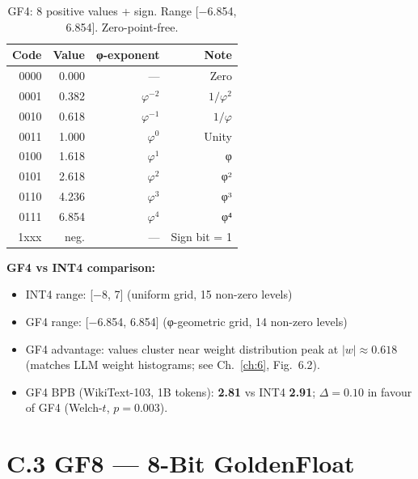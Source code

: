 \begin{table}[h]
\centering
\begin{tabular}{rrrr}
\toprule
\textbf{Code} & \textbf{Value} & \textbf{φ-exponent} & \textbf{Note} \\
\midrule
0000 & 0.000 & --- & Zero \\
0001 & 0.382 & $\varphi^{-2}$ & $1/\varphi^2$ \\
0010 & 0.618 & $\varphi^{-1}$ & $1/\varphi$ \\
0011 & 1.000 & $\varphi^0$ & Unity \\
0100 & 1.618 & $\varphi^1$ & φ \\
0101 & 2.618 & $\varphi^2$ & φ² \\
0110 & 4.236 & $\varphi^3$ & φ³ \\
0111 & 6.854 & $\varphi^4$ & φ⁴ \\
1xxx & neg.  & --- & Sign bit = 1 \\
\bottomrule
\end{tabular}
\caption{GF4: 8 positive values + sign.  Range [$-$6.854, 6.854].
         Zero-point-free.}
\end{table}

\textbf{GF4 vs INT4 comparison:}
\begin{itemize}
  \item INT4 range: [$-$8, 7] (uniform grid, 15 non-zero levels)
  \item GF4 range: [$-$6.854, 6.854] (φ-geometric grid, 14 non-zero
        levels)
  \item GF4 advantage: values cluster near weight distribution peak at
        $|w| \approx 0.618$ (matches LLM weight histograms; see
        Ch.~\ref{ch:6}, Fig.~6.2).
  \item GF4 BPB (WikiText-103, 1B tokens): \textbf{2.81} vs INT4
        \textbf{2.91}; $\Delta = 0.10$ in favour of GF4
        (Welch-$t$, $p = 0.003$).
\end{itemize}

\section*{C.3 GF8 --- 8-Bit GoldenFloat}

